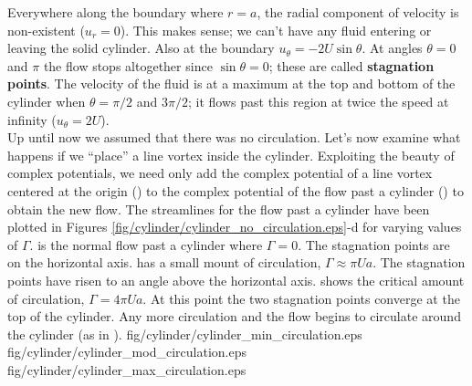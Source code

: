 \documentclass[12pt]{book}
\begin{document}
Everywhere along the boundary where $r=a$, the radial component of velocity is non-existent ($u_r = 0$). This makes sense; we can't have any fluid entering or leaving the solid cylinder.  Also at the boundary $u_\theta = -2U\sin\theta$.  At angles $\theta=0$ and $\pi$ the flow stops altogether since $\sin\theta=0$; these are called \textbf{stagnation points}.  The velocity of the fluid is at a maximum at the top and bottom of the cylinder when $\theta=\pi/2$ and $3\pi/2$; it flows past this region at twice the speed at infinity ($u_\theta = 2U$).\\

Up until now we assumed that there was no circulation.  Let's now examine what happens if we ``place'' a line vortex inside the cylinder.  Exploiting the beauty of complex potentials, we need only add the complex potential of a line vortex centered at the origin () to the complex potential of the flow past a cylinder () to obtain the new flow.
The streamlines for the flow past a cylinder have been plotted in Figures \ref{fig/cylinder/cylinder_no_circulation.eps}-d for varying values of $\Gamma$.  is the normal flow past a cylinder where $\Gamma=0$.  The stagnation points are on the horizontal axis.   has a small mount of circulation, $\Gamma\approx \pi U a$.  The stagnation points have risen to an angle above the horizontal axis.   shows the critical amount of circulation, $\Gamma = 4\pi Ua$.  At this point the two stagnation points converge at the top of the cylinder.  Any more circulation and the flow begins to circulate around the cylinder (as in ).
{fig/cylinder/cylinder_min_circulation.eps}
{fig/cylinder/cylinder_mod_circulation.eps}
{fig/cylinder/cylinder_max_circulation.eps}
\end{document}
